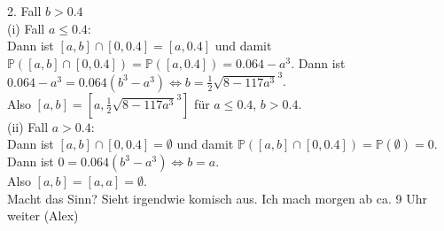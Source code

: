 \documentclass[11pt,a4paper,ngerman]{article}
\newcommand{\Prob}{\mathbb{P}}
\begin{document}
2. Fall $b > 0.4$ \\
(i) Fall $a \leq 0.4$: \\
Dann ist $[a,b] \cap [0,0.4] = [a, 0.4]$ und damit  $\Prob([a,b] \cap [0,0.4]) = \Prob([a,0.4]) = 0.064 - a^3$.
Dann ist $ 0.064 - a^3 =  0.064 (b^3 - a^3) \Leftrightarrow b = \frac{1}{2} \sqrt{8-117a^3}^3$. \\
Also $[a,b] = [a,\frac{1}{2} \sqrt{8-117a^3}^3]$ für $a \leq 0.4$, $b > 0.4$. \\

(ii) Fall $a > 0.4$: \\
Dann ist $[a,b] \cap [0,0.4] = \emptyset$ und damit  $\Prob([a,b] \cap [0,0.4]) = \Prob(\emptyset) =0$.
Dann ist $ 0=  0.064 (b^3 - a^3) \Leftrightarrow b = a$. \\
Also $[a,b] = [a,a] = \emptyset$. \\

Macht das Sinn? Sieht irgendwie komisch aus.
Ich mach morgen ab ca. 9 Uhr weiter (Alex)


\label{LastPage}
\end{document}
